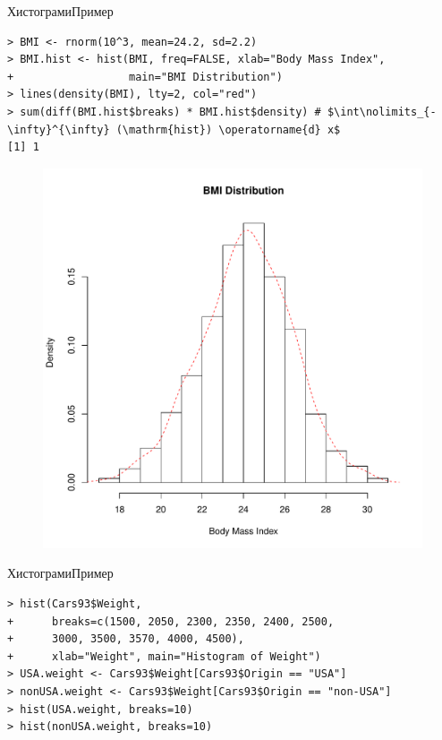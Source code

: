 \documentclass[hyperref={unicode}, xcolor={svgnames, table},
usepdftitle=false]{beamer}
\theoremstyle{remark}
\begin{document}
\begin{frame}[fragile]{Хистограми}{Пример}
\begin{verbatim}
> BMI <- rnorm(10^3, mean=24.2, sd=2.2)
> BMI.hist <- hist(BMI, freq=FALSE, xlab="Body Mass Index",
+                  main="BMI Distribution")
> lines(density(BMI), lty=2, col="red")
> sum(diff(BMI.hist$breaks) * BMI.hist$density) # $\int\nolimits_{-\infty}^{\infty} (\mathrm{hist}) \operatorname{d} x$
[1] 1
\end{verbatim}
  \begin{figure}
    \centering
    \includegraphics[width=.33\textwidth]{Histogram_BMI.pdf}
  \end{figure}
\end{frame}

\begin{frame}[fragile]{Хистограми}{Пример}
\begin{verbatim}
> hist(Cars93$Weight,
+      breaks=c(1500, 2050, 2300, 2350, 2400, 2500,
+      3000, 3500, 3570, 4000, 4500),
+      xlab="Weight", main="Histogram of Weight")
> USA.weight <- Cars93$Weight[Cars93$Origin == "USA"]
> nonUSA.weight <- Cars93$Weight[Cars93$Origin == "non-USA"]
> hist(USA.weight, breaks=10)
> hist(nonUSA.weight, breaks=10)
\end{verbatim}
\end{frame}

\end{document}

